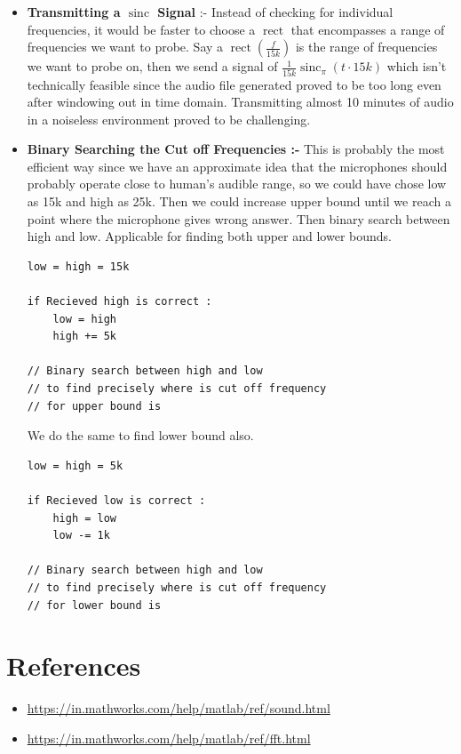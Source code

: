 \documentclass{report}
\DeclareMathOperator{\sinc}{sinc}
\DeclareMathOperator{\rect}{rect}
\begin{document}
\begin{itemize}
    \item \textbf{Transmitting a $\sinc$ Signal } :- Instead of checking for individual frequencies, it would be faster to choose a $\rect$ that encompasses a range of frequencies we want to probe. Say a $\rect \left( \frac{f}{15k} \right) $  is the range of frequencies we want to probe on, then we send a signal of $\frac{1}{15k}\sinc_{\pi}\left( t \cdot 15k \right)$ which isn't technically feasible since the audio file generated proved to be too long even after windowing out in time domain. Transmitting almost 10 minutes of audio in a noiseless environment proved to be challenging.  
    
    \item \textbf{Binary Searching the Cut off Frequencies :- } This is probably the most efficient way since we have an approximate idea that the microphones should probably operate close to human's audible range, so we could have chose low as 15k and high as 25k. Then we could increase upper bound until we reach a point where the microphone gives wrong answer. Then binary search between high and low. Applicable for finding both upper and lower bounds.

\begin{lstlisting}
low = high = 15k

if Recieved high is correct :
	low = high
	high += 5k

// Binary search between high and low 
// to find precisely where is cut off frequency
// for upper bound is

\end{lstlisting}

We do the same to find lower bound also.

\begin{lstlisting}
low = high = 5k

if Recieved low is correct :
	high = low
	low -= 1k

// Binary search between high and low 
// to find precisely where is cut off frequency
// for lower bound is
\end{lstlisting}

\end{itemize}


\section{References}

\begin{itemize}
    \item \url{https://in.mathworks.com/help/matlab/ref/sound.html}
    \item  \url{https://in.mathworks.com/help/matlab/ref/fft.html}
\end{itemize}
\end{document}
